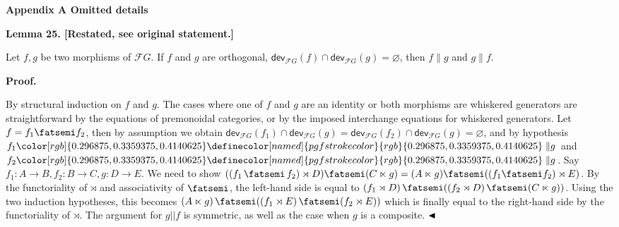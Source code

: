 \documentclass[10pt,a4paper]{article}
\begin{document}


 
\par\medskip\noindent\textbf{Appendix A Omitted details}\par
 
 
 
\par\medskip\noindent\textbf{Lemma 25. [Restated, see original statement.]}\par
 
 
Let $f,g$ be two morphisms of $\mathcal{F}G$. If $f$ and $g$ are orthogonal, $\mathsf{dev}_{\mathcal{F}G}(f)\cap\mathsf{dev}_{\mathcal{F}G}(g)=\varnothing$, then $f\parallel g$ and $g\parallel f$.\par
 
 
 
 
 
\par\medskip\noindent\textbf{Proof.}\par
 
 
By structural induction on $f$ and $g$. The cases where one of $f$ and $g$ are an identity or both morphisms are whiskered generators are straightforward by the equations of premonoidal categories, or by the imposed interchange equations for whiskered generators. Let $f=f_{1}{\mathop{\fatsemi}}f_{2}$, then by assumption we obtain $\mathsf{dev}_{\mathcal{F}G}(f_{1})\cap\mathsf{dev}_{\mathcal{F}G}(g)=\mathsf{dev}_{\mathcal{F}G}(f_{2})\cap\mathsf{dev}_{\mathcal{F}G}(g)=\varnothing$, and by hypothesis $f_{1}{\color[rgb]{0.296875,0.3359375,0.4140625}\definecolor[named]{pgfstrokecolor}{rgb}{0.296875,0.3359375,0.4140625}\parallel}g$ and $f_{2}{\color[rgb]{0.296875,0.3359375,0.4140625}\definecolor[named]{pgfstrokecolor}{rgb}{0.296875,0.3359375,0.4140625}\parallel}g$. Say $f_{1}:A\to B,f_{2}:B\to C,g:D\to E$. We need to show $((f_{1}\mathop{\fatsemi}f_{2})\rtimes D){\mathop{\fatsemi}}(C\ltimes g)=(A\ltimes g){\mathop{\fatsemi}}((f_{1}{\mathop{\fatsemi}}f_{2})\rtimes E)$. By the functoriality of $\rtimes$ and associativity of $\mathop{\fatsemi}$, the left-hand side is equal to $(f_{1}\rtimes D)\mathop{\fatsemi}((f_{2}\rtimes D)\mathop{\fatsemi}(C\ltimes g))$. Using the two induction hypotheses, this becomes $(A\ltimes g)\mathop{\fatsemi}((f_{1}\rtimes E)\mathop{\fatsemi}(f_{2}\rtimes E))$ which is finally equal to the right-hand side by the functoriality of $\rtimes$. The argument for $g||f$ is symmetric, as well as the case when $g$ is a composite. $\hfill\blacktriangleleft$\par
 
\end{document}
